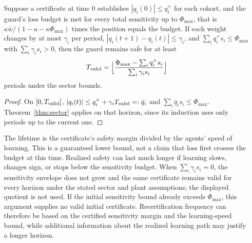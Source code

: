 \begin{corollary}\label{thm:lifetime}
Suppose a certificate at time $0$ establishes $|q_i(0)|\le q_i^+$ for each cohort, and the guard's loss budget is met for every total sensitivity up to $\Phi_{\max}$, that is $\kappa\bar w/(1-a-\kappa\Phi_{\max})$ times the position equals the budget. If each weight changes by at most $\gamma_i$ per period, $|q_i(t+1)-q_i(t)|\le\gamma_i$, and $\sum_iq_i^+s_i\le\Phi_{\max}$ with $\sum_i\gamma_is_i>0$, then the guard remains safe for at least
\[
T_{\rm valid}=\Bigl\lfloor\frac{\Phi_{\max}-\sum_iq_i^+s_i}{\sum_i\gamma_is_i}\Bigr\rfloor
\]
periods under the sector bounds. \hfill\Proved
\end{corollary}

\begin{proof}
On $[0,T_{\rm valid}]$, $|q_i(t)|\le q_i^++\gamma_iT_{\rm valid}=:\bar q_i$ and $\sum_i\bar q_is_i\le\Phi_{\max}$. Theorem~\ref{thm:sector} applies on that horizon, since its induction uses only periods up to the current one.
\end{proof}

The lifetime is the certificate's safety margin divided by the agents' speed of learning. This is a guaranteed lower bound, not a claim that loss first crosses the budget at this time. Realized safety can last much longer if learning slows, changes sign, or stops below the sensitivity budget. When $\sum_i\gamma_i s_i=0$, the sensitivity envelope does not grow and the same certificate remains valid for every horizon under the stated sector and plant assumptions; the displayed quotient is not used. If the initial sensitivity bound already exceeds $\Phi_{\max}$, this argument supplies no valid initial certificate. Recertification frequency can therefore be based on the certified sensitivity margin and the learning-speed bound, while additional information about the realized learning path may justify a longer horizon.

